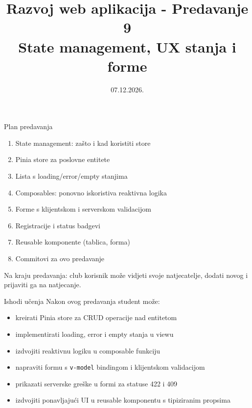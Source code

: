 

\title[Razvoj web aplikacija]{Razvoj web aplikacija - Predavanje 9 \\ State management, UX stanja i forme}
\date{07.12.2026.}



\frame{\titlepage}

\begin{frame}{Plan predavanja}
\begin{enumerate}
  \item State management: zašto i kad koristiti store
  \item Pinia store za poslovne entitete
  \item Lista s loading/error/empty stanjima
  \item Composables: ponovno iskoristiva reaktivna logika
  \item Forme s klijentskom i serverskom validacijom
  \item Registracije i status badgevi
  \item Reusable komponente (tablica, forma)
  \item Commitovi za ovo predavanje
\end{enumerate}

\vspace{0.6em}
Na kraju predavanja: club korisnik može vidjeti svoje natjecatelje, dodati novog i prijaviti ga na natjecanje.
\end{frame}

\begin{frame}{Ishodi učenja}
Nakon ovog predavanja student može:
\begin{itemize}
  \item kreirati Pinia store za CRUD operacije nad entitetom
  \item implementirati loading, error i empty stanja u viewu
  \item izdvojiti reaktivnu logiku u composable funkciju
  \item napraviti formu s \texttt{v-model} bindingom i klijentskom validacijom
  \item prikazati serverske greške u formi za statuse 422 i 409
  \item izdvojiti ponavljajući UI u reusable komponentu s tipiziranim propsima
\end{itemize}
\end{frame}

